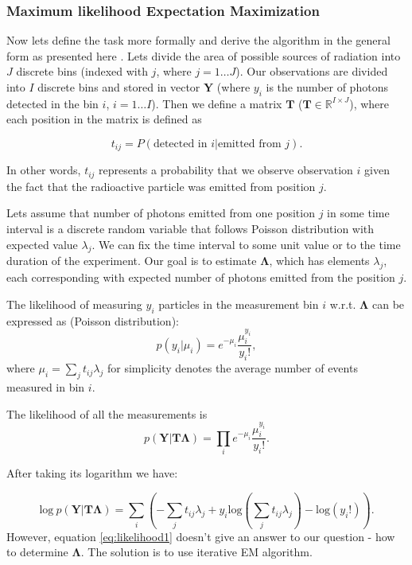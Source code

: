 \subsubsection{Maximum likelihood Expectation Maximization}

Now lets define the task more formally and derive the algorithm in the general form as presented here \cite{}.
Lets divide the area of possible sources of radiation into $J$ discrete bins (indexed with $j$, where $j = 1 \dotsc J$).
Our observations are divided into $I$ discrete bins and stored in vector $\mathbf{Y}$ (where $y_{i}$ is the number of photons detected in the bin $i$, $i = 1 \dotsc I$).
Then we define a matrix $\mathbf{T}$ ($\mathbf{T} \in \mathbb{R}^{I \times J}$), where each position in the matrix is defined as

\begin{equation}
  t_{ij} =  P(\textrm{detected in } i | \textrm{emitted from } j).
\end{equation}

In other words, $t_{ij}$ represents a probability that we observe observation $i$ given the fact that the radioactive particle was emitted from position $j$.

Lets assume that number of photons emitted from one position $j$ in some time interval is a discrete random variable that follows Poisson distribution with expected value $\lambda_{j}$.
We can fix the time interval to some unit value or to the time duration of the experiment.
Our goal is to estimate $\mathbf{\Lambda}$, which has elements $\lambda_{j}$, each corresponding with expected number of photons emitted from the position $j$.

The likelihood of measuring $y_{i}$ particles in the measurement bin $i$ w.r.t. $\mathbf{\Lambda}$ can be expressed as (Poisson distribution):
\begin{equation}
  p(y_{i} |\mu_{i} ) = e^{-\mu_{i}} \frac{\mu_{i}^{y_i}}{y_{i}!},
\end{equation}
where $\mu_{i} = \sum_{j} t_{ij}\lambda_{j}$ for simplicity denotes the average number of events measured in bin $i$.

The likelihood of all the measurements is
\begin{equation}  
  p(\mathbf{Y} | \mathbf{T\Lambda} ) = \prod_{i} e^{-\mu_{i}} \frac{\mu_{i}^{y_i}}{y_{i}!}.
\end{equation}

After taking its logarithm we have:

\begin{equation}  
  \mathrm{log}\ p(\mathbf{Y} | \mathbf{T\Lambda} ) = \sum_{i}\left ( -\sum_{j} t_{ij}\lambda_{j} + y_{i} \mathrm{log}(\sum_{j} t_{ij}\lambda_{j})  - \mathrm{log}(y_{i}!) \right ).
  \label{eq:likelihood1}
\end{equation}
However, equation \ref{eq:likelihood1} doesn't give an answer to our question - how to determine $\mathbf{\Lambda}$. The solution is to use iterative EM algorithm.

